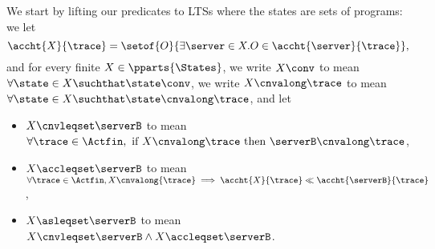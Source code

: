 We start by lifting our predicates to LTSs where the states are sets of programs: 
we let
$$\accht{ X }{ \trace } = \setof{ O }{ \exists \server \in X . O
  \in \accht{\server}{ \trace }},$$ and for every finite $X \in
\pparts{ \States }$, we write $X \conv$ to mean $\forall \state \in X \suchthat\state \conv$, we write $  X \cnvalong \trace$ to mean $\forall \state \in X \suchthat \state \cnvalong \trace$, and let

\begin{itemize}
\item $ X \cnvleqset \serverB$ to mean $\forall \trace \in \Actfin,
  \text{ if } X \cnvalong \trace
  \text{ then } \serverB \cnvalong \trace$,

\item
  $X \accleqset \serverB$ to mean $\forall \trace \in \Actfin,
  X \cnvalong{\trace} \implies \accht{ X }{ \trace } \ll \accht{ \serverB }{ \trace }$,

\item
  $X \asleqset \serverB$ to mean $X \cnvleqset \serverB \wedge X \accleqset \serverB$.
\end{itemize}

